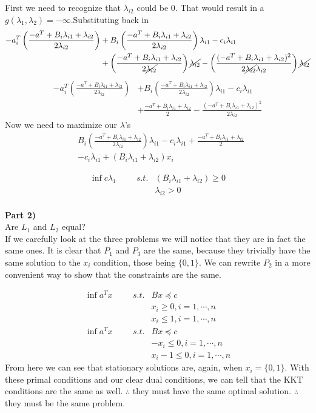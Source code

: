 \documentclass[12pt,letter]{article}
\newcommand{\ppart}[1]{\vspace{2mm}\large\textbf{\\Part {#1})\vspace{2mm}}\normalsize\\}
\begin{document}
First we need to recognize that $\lambda_{i2}$ could be 0. That would result in
a $g(\lambda_1,\lambda_2)=-\infty$.Substituting back in 
\begin{align*}
    -a_i^T\left(\frac{-a^T +B_i\lambda_{i1} + \lambda_{i2}}{2\lambda_{i2}}\right)
        &+ B_i\left(\frac{-a^T +B_i\lambda_{i1} + \lambda_{i2}}{2\lambda_{i2}}\right)\lambda_{i1}- c_i\lambda_{i1} \\
        &+ \left(\frac{-a^T +B_i\lambda_{i1} + \lambda_{i2}}{2\cancel{\lambda_{i2}}}\right)\cancel{\lambda_{i2}}
          -\left(\frac{(-a^T +B_i\lambda_{i1} + \lambda_{i2})^2}{2\cancel{\lambda_{i2}}\lambda_{i2}}\right)\cancel{\lambda_{i2}}
\end{align*}
\begin{align*}
    -a_i^T\left(\frac{-a^T +B_i\lambda_{i1} + \lambda_{i2}}{2\lambda_{i2}}\right)
        &+ B_i\left(\frac{-a^T +B_i\lambda_{i1} + \lambda_{i2}}{2\lambda_{i2}}\right)\lambda_{i1}- c_i\lambda_{i1} \\
        &+ \frac{-a^T +B_i\lambda_{i1} + \lambda_{i2}}{2}
          -\frac{(-a^T +B_i\lambda_{i1} + \lambda_{i2})^2}{2\lambda_{i2}}
\end{align*}
Now we need to maximize our $\lambda$'s
\begin{align*}
    &B_i\left(\frac{-a^T +B_i\lambda_{i1} + \lambda_{i2}}{2\lambda_{i2}}\right)\lambda_{i1}- c_i\lambda_{i1} 
        + \frac{-a^T +B_i\lambda_{i1} + \lambda_{i2}}{2}\\
    & -c_i\lambda_{i1} + (B_i\lambda_{i1} + \lambda_{i2})x_i
\end{align*}


\begin{align*}
    \inf c\lambda_1 \hspace{1cm}
    s.t. & (B_i\lambda_{i1} + \lambda_{i2}) \geq 0 \\
         & \lambda_{i2} > 0
\end{align*}
\ppart{2}
Are $L_1$ and $L_2$ equal?
\\
If we carefully look at the three problems we will notice that they are in fact the same ones. 
It is clear that $P_1$ and $P_3$ are the same, because they trivially have the 
same solution to the $x_i$ condition, those being $\{0,1\}$. We can rewrite
$P_2$ in a more convenient way to show that the constraints are the same.

\begin{align*}
    \inf a^T x \hspace{1cm}
    s.t. & Bx \preceq c \\
         & x_i \geq 0,i=1,\cdots,n\\
         & x_i \leq 1,i=1,\cdots,n\\
    \inf a^T x \hspace{1cm}
    s.t. & Bx \preceq c \\
         & -x_i \leq 0,i=1,\cdots,n\\
         & x_i -1 \leq 0,i=1,\cdots,n
\end{align*}
From here we can see that stationary solutions are, again, when $x_i=\{0,1\}$.
With these primal conditions and our clear dual conditions, we can tell that 
the KKT conditions are the same as well. $\therefore$ they must have the same 
optimal solution. $\therefore$ they must be the same problem. 
\end{document}
